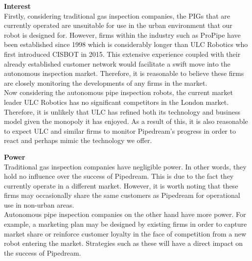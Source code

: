 \documentclass[11pt]{article}		%
\begin{document}
            \textbf{Interest}\\
            Firstly, considering traditional gas inspection companies, the PIGs that are currently operated are unsuitable for use in the urban environment that our robot is designed for. However, firms within the industry such as ProPipe have been established since 1998 which is considerably longer than ULC Robotics who first introduced CISBOT in 2015. This extensive experience coupled with their already established customer network would facilitate a swift move into the autonomous inspection market. Therefore, it is reasonable to believe these firms are closely monitoring the developments of any firms in the market. \\
            \hspace*{3ex}Now considering the autonomous pipe inspection robots, the current market leader ULC Robotics has no significant competitors in the London market. Therefore, it is unlikely that ULC has refined both its technology and business model given the monopoly it has enjoyed. As a result of this, it is also reasonable to expect ULC and similar firms to monitor Pipedream's progress in order to react and perhaps mimic the technology we offer. 
            
            \textbf{Power}\\
            Traditional gas inspection companies have negligible power. In other words, they hold no influence over the success of Pipedream. This is due to the fact they currently operate in a different market. However, it is worth noting that these firms may occasionally share the same customers as Pipedream for operational use in non-urban areas. \\
            \hspace*{3ex}Autonomous pipe inspection companies on the other hand have more power. For example, a marketing plan may be designed by existing firms in order to capture market share or reinforce customer loyalty in the face of competition from a new robot entering the market. Strategies such as these will have a direct impact on the success of Pipedream. 
            
\end{document}
